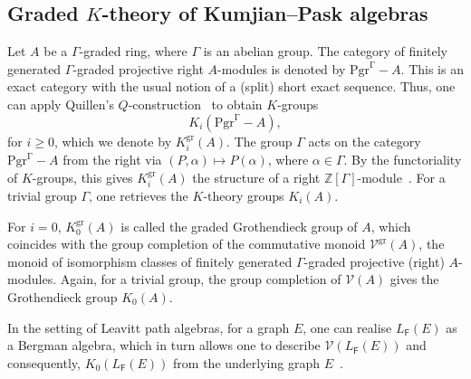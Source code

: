 \documentclass[12pt]{amsart}
\newcommand{\Pgr}[1][]{{\operatorname{{Pgr}^{#1}\!-}}}
\theoremstyle{definition}
\theoremstyle{remark}
\newcommand{\gr}{\operatorname{gr}}
\begin{document}
\subsection{Graded $K$-theory of Kumjian--Pask algebras}\label{ssec graded K-theory}

Let $A$ be a $\Gamma$\!-graded ring, where $\Gamma$ is an abelian group.  The category of  finitely generated
$\Gamma$\!-graded  projective right $A$-modules is denoted by $\Pgr[\Gamma] A$. This 
is an exact category with the usual notion of a (split) short exact
sequence. Thus, one can apply Quillen's $Q$-construction~\cite{quillen} to obtain $K$-groups
\[K_i(\Pgr[\Gamma] A),\] for $i\ge 0$, which we denote by $K_i^{\gr}(A)$. 
 The group $\Gamma$ acts on the category
$\Pgr[\Gamma] A$ from the right via $(P,\alpha) \longmapsto P(\alpha)$, where $\alpha \in \Gamma$. By the functoriality of $K$-groups, this gives $K_i^{\gr}(A)$ the structure of a right $\mathbb Z[\Gamma]$-module~\cite{hazgrothen}. For a trivial group $\Gamma$, one retrieves the $K$-theory groups $K_i(A)$.

For $i=0$, $K^{\gr}_0(A)$ is called the graded Grothendieck group of $A$, which coincides with the group completion of the commutative monoid $\mathcal V^{\gr}(A)$, the monoid of isomorphism classes of  finitely generated $\Gamma$-graded projective (right) $A$-modules. Again, for a trivial group, the group completion of $\mathcal V(A)$ gives the Grothendieck group $K_0(A)$.  

In the setting of Leavitt path algebras, for a graph $E$, one can realise $L_\mathsf{F}(E)$ as a Bergman algebra, which in turn allows one to  describe $\mathcal V(L_\mathsf{F}(E))$ and consequently, $K_0(L_\mathsf{F}(E))$ from the underlying graph $E$~\cite{Ara}. 
\end{document}

